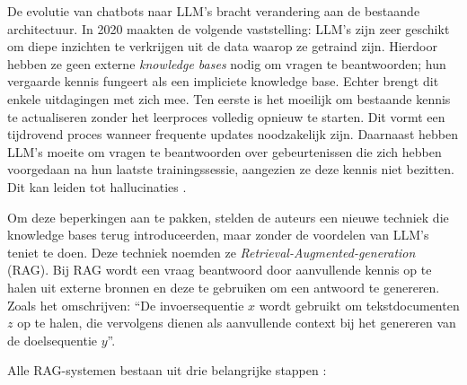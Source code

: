 De evolutie van chatbots naar \acrshort{LLM}'s bracht verandering aan de bestaande architectuur. In 2020 maakten \textcite{Lewis2020} de volgende vaststelling: LLM's zijn zeer geschikt om diepe inzichten te verkrijgen uit de data waarop ze getraind zijn. Hierdoor hebben ze geen externe \emph{knowledge bases} nodig om vragen te beantwoorden; hun vergaarde kennis fungeert als een impliciete knowledge base. Echter brengt dit enkele uitdagingen met zich mee. Ten eerste is het moeilijk om bestaande kennis te actualiseren zonder het leerproces volledig opnieuw te starten. Dit vormt een tijdrovend proces wanneer frequente updates noodzakelijk zijn. Daarnaast hebben LLM's moeite om vragen te beantwoorden over gebeurtenissen die zich hebben voorgedaan na hun laatste trainingssessie, aangezien ze deze kennis niet bezitten. Dit kan leiden tot hallucinaties \autocite{Gao2023}.

Om deze beperkingen aan te pakken, stelden de auteurs een nieuwe techniek die knowledge bases terug introduceerden, maar zonder de voordelen van \acrshort{LLM}'s teniet te doen. Deze techniek noemden ze \emph{Retrieval-Augmented-generation} (RAG). Bij RAG wordt een vraag beantwoord door aanvullende kennis op te halen uit externe bronnen en deze te gebruiken om een antwoord te genereren. Zoals \textcite{Lewis2020} het omschrijven: ``De invoersequentie $x$ wordt gebruikt om tekstdocumenten $z$ op te halen, die vervolgens dienen als aanvullende context bij het genereren van de doelsequentie $y$''.

Alle RAG-systemen bestaan uit drie belangrijke stappen \autocite{Gao2023}:  

